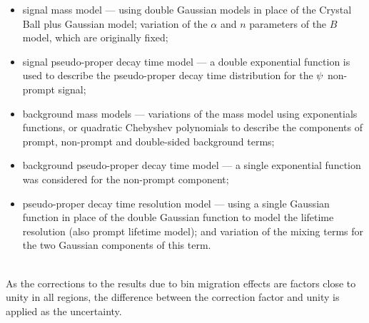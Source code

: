 \begin{description}[style=unboxed,leftmargin=0cm]
\begin{itemize}

  \item  signal mass model --- using double Gaussian models in place of the Crystal Ball plus Gaussian model;  variation of the
 $\alpha$ and $n$ parameters of the $B$ model, which are originally fixed;

    \item  signal pseudo-proper decay time model --- a double exponential function is used to describe the pseudo-proper decay time distribution for the 
    $\psi$ non-prompt signal;

  \item  background mass models --- variations of the mass model using exponentials functions, or quadratic Chebyshev polynomials to describe the components of prompt,
 non-prompt and double-sided background terms;

  \item  background pseudo-proper decay time model --- a single exponential function was considered for the non-prompt component;

  \item  pseudo-proper decay time resolution model --- using a single Gaussian function in place of the double Gaussian function to model the lifetime resolution
 (also prompt lifetime model); and variation of the mixing terms for the two Gaussian components of this term.

\end{itemize}

  \item[Bin migrations] \hfill \\
As the corrections to the results due to bin migration effects are factors close to unity in all regions, the difference between the correction factor and unity is applied as the uncertainty. 

\end{description}

